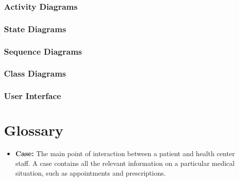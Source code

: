 \documentclass[a4paper, 12pt, titlepage]{article}
\begin{document}
  \subsubsection{Activity Diagrams}

  \subsubsection{State Diagrams}

  \subsubsection{Sequence Diagrams}

  \subsubsection{Class Diagrams}

  \subsubsection{User Interface}

  \section{Glossary}

  \begin{itemize}
    \item \textbf{Case:} The main point of interaction between a patient and health center staff.
      A case contains all the relevant information on a particular medical situation,
      such as appointments and prescriptions.

  \end{itemize}
\end{document}

